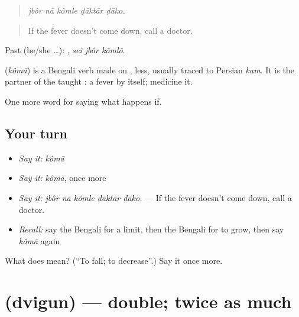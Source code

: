 \begin{quote}
    
\end{quote}

\begin{quote}
\emph{jbôr nā kômle ḍāktār ḍāko.}
\end{quote}

\begin{quote}
If the fever doesn't come down, call a doctor.
\end{quote}

Past (he/she …):   , \emph{sei jbôr kômlô}.

\begin{cousinweb}
\textbf{} (\emph{kômā}) is a Bengali verb made on , less, usually traced to Persian \emph{kam}. It is the partner of the taught : a fever  by itself; medicine  it.
\end{cousinweb}

\begin{grammarlens}[title={What you've built}]
One more word for saying what happens if.
\end{grammarlens}

\subsection*{Your turn}
\begin{itemize}
\raggedright
  \item \emph{Say it:} \emph{kômā}
  \item \emph{Say it:} \emph{kômā}, once more
  \item \emph{Say it:} \emph{jbôr nā kômle ḍāktār ḍāko.} — If the fever doesn't come down, call a doctor.
  \item \emph{Recall:} say the Bengali for a limit, then the Bengali for to grow, then say \emph{kômā} again
\end{itemize}

\begin{tcolorbox}[breakable,colback=teal!4,colframe=teal!35!black,title={Before you move on}]
What does  mean? (\textquotedblleft{}To fall; to decrease\textquotedblright{}.) Say it once more.
\end{tcolorbox}
\section[\texorpdfstring{\bn{দ্বিগুণ} (dvigun)}{দ্বিগুণ (dvigun)}]{ (dvigun) — double; twice as much}


